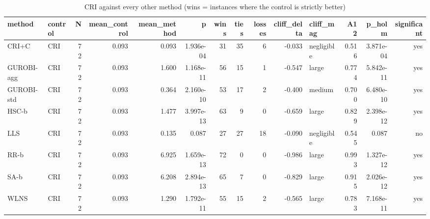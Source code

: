 \begin{table}[htbp]
\centering
\small
\caption{CRI against every other method (wins = instances where the control is strictly better)}
\label{tab:E4b_equal_budgets_60s_b60_vs_CRI}
\begin{tabular}{llrrrrrrrrlrrr}
\toprule
method & control & N & mean\_control & mean\_method & p & wins & ties & losses & cliff\_delta & cliff\_mag & A12 & p\_holm & significant \\
\midrule
CRI+C & CRI & 72 & 0.093 & 0.093 & 1.936e-04 & 31 & 35 & 6 & -0.033 & negligible & 0.516 & 3.871e-04 & yes \\
GUROBI-agg & CRI & 72 & 0.093 & 1.600 & 1.168e-11 & 56 & 15 & 1 & -0.547 & large & 0.774 & 5.842e-11 & yes \\
GUROBI-std & CRI & 72 & 0.093 & 0.364 & 2.160e-10 & 53 & 17 & 2 & -0.400 & medium & 0.700 & 6.480e-10 & yes \\
HSC-b & CRI & 72 & 0.093 & 1.477 & 3.997e-13 & 63 & 9 & 0 & -0.659 & large & 0.829 & 2.398e-12 & yes \\
LLS & CRI & 72 & 0.093 & 0.135 & 0.087 & 27 & 27 & 18 & -0.090 & negligible & 0.545 & 0.087 & no \\
RR-b & CRI & 72 & 0.093 & 6.925 & 1.659e-13 & 72 & 0 & 0 & -0.986 & large & 0.993 & 1.327e-12 & yes \\
SA-b & CRI & 72 & 0.093 & 6.208 & 2.894e-13 & 65 & 7 & 0 & -0.829 & large & 0.915 & 2.026e-12 & yes \\
WLNS & CRI & 72 & 0.093 & 1.290 & 1.792e-11 & 55 & 15 & 2 & -0.565 & large & 0.783 & 7.168e-11 & yes \\
\bottomrule
\end{tabular}
\end{table}
